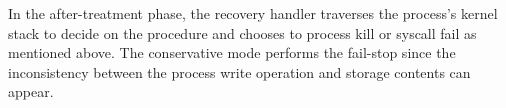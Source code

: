 In the after-treatment phase, the recovery handler traverses the process's kernel stack to decide on the procedure and chooses to process kill or syscall fail as mentioned above. The conservative mode performs the fail-stop since the inconsistency between the process write operation and storage contents can appear.

